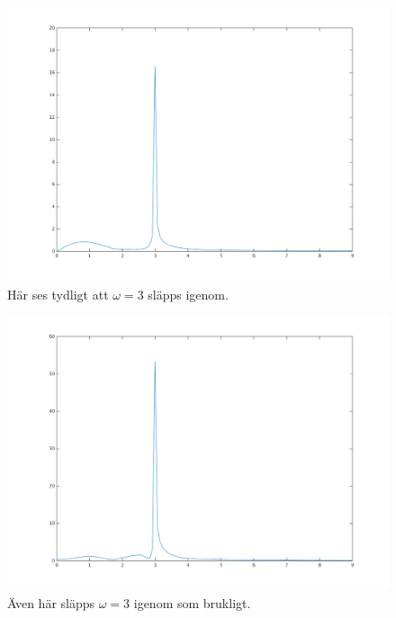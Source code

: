 \begin{figure}
    \label{fig:task4e-fk-x-sys2}
    \caption{Här ses tydligt att $\omega = 3$ släpps igenom.}
    \centering
    \includegraphics[scale=0.55]{figures/task4e-fk-x-sys2.png}
\end{figure}

\begin{figure}
    \label{fig:task4e-fk-y-sys2}
    \caption{Även här släpps $\omega = 3$ igenom som brukligt.}
    \centering
    \includegraphics[scale=0.55]{figures/task4e-fk-y-sys2.png}
\end{figure}

\clearpage

